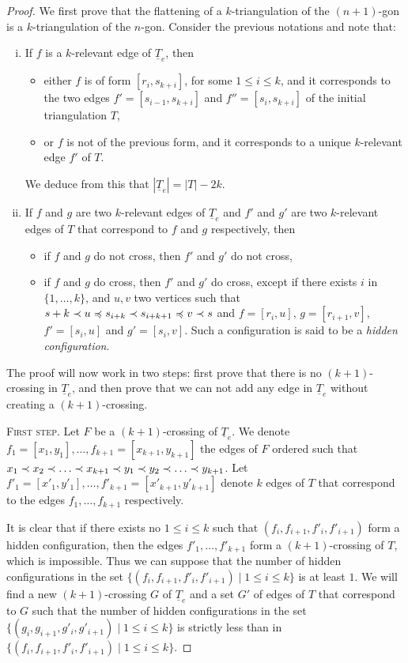 \documentclass[12pt]{amsart}
\begin{document}
\begin{proof}
We first prove that the flattening of a $k$-triangulation of the $(n+1)$-gon is a $k$-triangulation of the $n$-gon. Consider the previous notations and note that:
\begin{enumerate}[(i)]
\item If $f$ is a $k$-relevant edge of $\underline{T}_e$, then
\begin{itemize}
\item either $f$ is of form $[r_i,s_{k+i}]$, for some $1\le i\le k$, and it corresponds to the two edges $f'=[s_{i-1},s_{k+i}]$ and $f''=[s_i,s_{k+i}]$ of the initial triangulation $T$,
\item or $f$ is not of the previous form, and it corresponds to a unique $k$-relevant edge $f'$ of $T$.
\end{itemize}
We deduce from this that $|\underline{T}_e|=|T|-2k$.

\item If $f$ and $g$ are two $k$-relevant edges of $\underline{T}_e$ and $f'$ and $g'$ are two $k$-relevant edges of $T$ that correspond to $f$ and $g$ respectively, then
\begin{itemize}
\item if $f$ and $g$ do not cross, then $f'$ and $g'$ do not cross,
\item if $f$ and $g$ do cross, then $f'$ and $g'$ do cross, except if there exists $i$ in $\{1,\ldots,k\}$, and $u,v$ two vertices such that $s+k\prec u\preccurlyeq s_{i+k}\prec s_{i+k+1}\preccurlyeq v\prec s$ and $f=[r_i,u]$, $g=[r_{i+1},v]$, $f'=[s_i,u]$ and $g'=[s_i,v]$. Such a configuration is said to be a \emph{hidden configuration}.
\end{itemize}

\end{enumerate}

The proof will now work in two steps: first prove that there is no $(k+1)$-crossing in $\underline{T}_e$, and then prove that we can not add any edge in $\underline{T}_e$ without creating a $(k+1)$-crossing.

\medskip
\noindent\textsc{First step.}
Let $F$ be a $(k+1)$-crossing of $\underline{T}_e$. We denote $f_1=[x_1,y_1],\ldots,f_{k+1}=[x_{k+1},y_{k+1}]$ the edges of $F$ ordered such that $x_1\prec x_2\prec\ldots\prec x_{k+1}\prec y_1\prec y_2\prec \ldots\prec y_{k+1}$. Let $f'_1=[x'_1,y'_1],\ldots,f'_{k+1}=[x'_{k+1},y'_{k+1}]$ denote $k$ edges of $T$ that correspond to the edges $f_1,\ldots,f_{k+1}$ respectively.

It is clear that if there exists no $1\le i\le k$ such that $(f_i,f_{i+1},f'_i,f'_{i+1})$ form a hidden configuration, then the edges $f'_1,\ldots,f'_{k+1}$ form a $(k+1)$-crossing of $T$, which is impossible. Thus we can suppose that the number of hidden configurations in the set $\{(f_i,f_{i+1},f'_i,f'_{i+1})\;|\; 1\le i\le k\}$ is at least $1$. We will find a new $(k+1)$-crossing $G$ of $\underline{T}_e$ and a set $G'$ of edges of $T$ that correspond to $G$ such that the number of hidden configurations in the set $\{(g_i,g_{i+1},g'_i,g'_{i+1})\;|\; 1\le i\le k\}$ is strictly less than in $\{(f_i,f_{i+1},f'_i,f'_{i+1})\;|\; 1\le i\le k\}$.


\end{proof}
\end{document}
